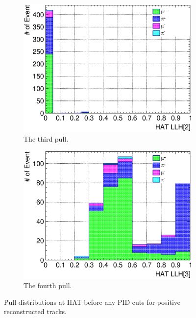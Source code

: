 \begin{figure}
\begin{subfigure}{\dbfigwid\textwidth}
               \end{subfigure}
               \\
               \begin{subfigure}{\dbfigwid\textwidth}
                    \includegraphics[width=\textwidth]{figures/sel/sspi_TOP_hat_pid2_stack_al5.eps}
                    \caption{The third pull.}
                    \label{subfig:sppi-pulls-3}
               \end{subfigure}
               \begin{subfigure}{\dbfigwid\textwidth}
                    \includegraphics[width=\textwidth]{figures/sel/sspi_TOP_hat_pid3_stack_al5.eps}
                    \caption{The fourth pull.}
                    \label{subfig:sppi-pulls-4}
               \end{subfigure}
               \caption{Pull distributions at HAT before any PID cuts for positive reconstructed tracks.}
               \label{fig:pulls}
          \end{figure}

